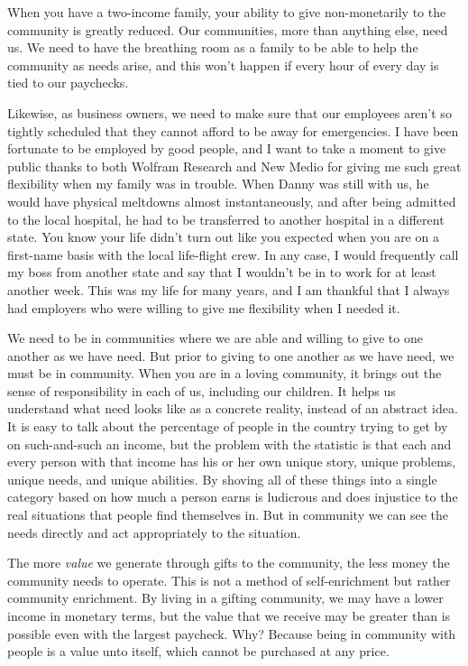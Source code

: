 When you have a two-income family, your ability to give non-monetarily
to the community is greatly reduced. Our communities, more than
anything else, need us. We need to have the breathing room as a family
to be able to help the community as needs arise, and this won’t happen
if every hour of every day is tied to our paychecks.

Likewise, as business owners, we need to make sure that our employees
aren’t so tightly scheduled that they cannot afford to be away for
emergencies. I have been fortunate to be employed by good people, and I
want to take a moment to give public thanks to both Wolfram Research
and New Medio for giving me such great flexibility when my family was
in trouble. When Danny was still with us, he would have physical
meltdowns almost instantaneously, and after being admitted to the local
hospital, he had to be transferred to another hospital in a different
state. You know your life didn’t turn out like you expected when you
are on a first-name basis with the local life-flight crew. In any case,
I would frequently call my boss from another state and say that I
wouldn’t be in to work for at least another week. This was my life for
many years, and I am thankful that I always had employers who were
willing to give me flexibility when I needed it.

We need to be in communities where we are able and willing to give to
one another as we have need. But prior to giving to one another as we
have need, we must be in community. When you are in a loving community,
it brings out the sense of responsibility in each of us, including our
children. It helps us understand what need looks like as a concrete
reality, instead of an abstract idea. It is easy to talk about the
percentage of people in the country trying to get by on such-and-such
an income, but the problem with the statistic is that each and every
person with that income has his or her own unique story, unique
problems, unique needs, and unique abilities. By shoving all of these
things into a single category based on how much a person earns is
ludicrous and does injustice to the real situations that people find
themselves in. But in community we can see the needs directly and act
appropriately to the situation. 

The more \textit{value} we generate through gifts to the community, the
less money the community needs to operate. This is not a method of
self-enrichment but rather community enrichment. By living in a gifting
community, we may have a lower income in monetary terms, but the value
that we receive may be greater than is possible even with the largest
paycheck. Why?  Because being in community with people is a value unto
itself, which cannot be purchased at any price.

